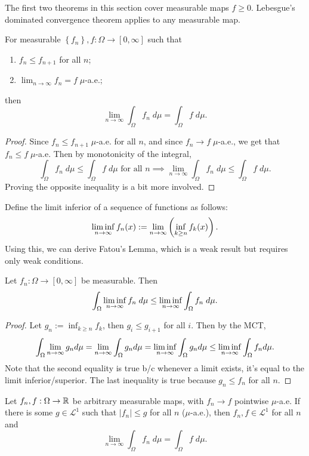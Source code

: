 \documentclass[twoside,10pt]{article}
\begin{document}
The first two theorems in this section cover measurable maps $f \geq 0$. Lebesgue's dominated convergence theorem applies to any measurable map.

\begin{thrm}
For measurable $\left\{ f_{n} \right\}, f : \Omega \to [0,\infty]$ such that
\begin{enumerate}
	\item $f_{n} \leq f_{n+1}$ for all $n$;
	\item $\lim_{n \to \infty} f_{n} = f \; \mu$-a.e.;
\end{enumerate}
then
\[
\lim_{n \to \infty} \int_{\Omega} f_{n}\;d\mu = \int_{\Omega} f\;d\mu.
\] 
\end{thrm}
\begin{proof}
	Since $f_{n} \leq f_{n+1} \;\mu$-a.e. for all $n$, and since $f_{n} \to f\;\mu$-a.e., we get that $f_{n} \leq f \;\mu$-a.e. Then by monotonicity of the integral,
	\[
	\int_{\Omega} f_{n}\;d\mu \leq \int_{\Omega} f\;d\mu \text{ for all } n \implies \lim_{n \to \infty} \int_{\Omega} f_{n}\;d\mu \leq \int_{\Omega} f\;d\mu.
	\] Proving the opposite inequality is a bit more involved. 
\end{proof}

Define the limit inferior of a sequence of functions as follows:
\[
	\liminf_{ n \to\infty} f_{n}(x) := \lim_{n \to \infty} \left( \inf_{k \geq n}f_{k}(x) \right).
\] 
Using this, we can derive Fatou's Lemma, which is a weak result but requires only weak conditions.

\begin{thrm}
Let $f_{n}: \Omega\to [0,\infty]$ be measurable. Then
\[
\int_{\Omega} \liminf_{ n \to\infty} f_{n} \;d\mu \leq \liminf_{ n \to\infty} \int_{\Omega} f_{n}\;d\mu.
\] 
\end{thrm}
\begin{proof}
	Let $g_{n} := \inf_{k \geq n}f_{k}$, then $g_{i} \leq g_{i+1}$ for all $i$. Then by the MCT,
	\[
	\int_{\Omega} \lim_{n \to \infty} g_{n} d\mu = \lim_{n \to \infty} \int_{\Omega} g_{n}d\mu = \liminf_{ n \to\infty} \int_{\Omega} g_{n}d\mu \leq \liminf_{ n \to\infty} \int_{\Omega} f_{n}d\mu.
	\] Note that the second equality is true b/c whenever a limit exists, it's equal to the limit inferior/superior. The last inequality is true because $g_{n} \leq f_{n}$ for all $n$.
\end{proof}

\begin{thrm}
Let $f_{n}, f : \Omega\to \mathbb{R}$ be arbitrary measurable maps, with $f_{n}\to f$ pointwise $\mu$-a.e. If there is some $g \in \mathcal{L}^{1}$ such that $|f_{n}| \leq g$ for all $n$ ($\mu$-a.e.), then $f_{n}, f \in \mathcal{L}^{1}$ for all $n$ and
\[
	\lim_{n \to \infty} \int_{\Omega} f_{n}\;d\mu = \int_{\Omega} f \; d\mu.
\] 
\end{thrm}
\end{document}
